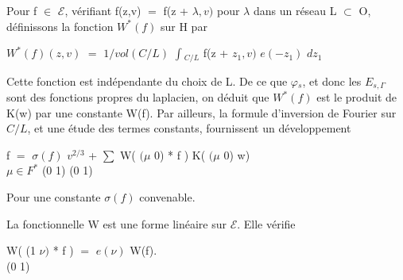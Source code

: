\documentclass[10pt,a4paper]{article}
\begin{document}
\par Pour f $\in{}$ $\mathcal{E}$, vérifiant f(z,v) $=$ f(z + $\lambda{},v)$ pour $\lambda{}$ dans un réseau L $\subset{}$ O, définissons la fonction $W^*(f)$ sur H par\par
\par $W^*(f)(z,v)$ $=$ $1/vol(C/L)$ $\int{}_{C/L}$ f(z + $z_1,v)$ $e(-z_1)$ $dz_1$\par
\par Cette fonction est indépendante du choix de L. De ce que $\varphi{}_s$, et donc les $E_{s,\Gamma{}}$ sont des fonctions propres du laplacien, on déduit que $W^*(f)$ est le produit de K(w) par une constante W(f). Par ailleurs, la formule d'inversion de Fourier sur $C/L$, et une étude des termes constants, fournissent un développement\par
\par\smallskip\begin{center}\begin{minipage}{0.96\textwidth}\centering
f $=$ $\sigma{}(f)$ $v^{2/3}$ + $\sum{}$ W( $(\mu{}$ 0) * f ) K( $(\mu{}$ 0) w) \\ $\mu{}\in{}F^*$ (0 1) (0 1)
\end{minipage}\end{center}\smallskip
\par Pour une constante $\sigma{}(f)$ convenable.\par
\par La fonctionnelle W est une forme linéaire sur $\mathcal{E}$. Elle vérifie\par
\par\smallskip\begin{center}\begin{minipage}{0.96\textwidth}\centering
W( (1 $\nu{})$ * f ) $=$ $e(\nu{})$ W(f). \\ (0 1)
\end{minipage}\end{center}\smallskip
\end{document}
